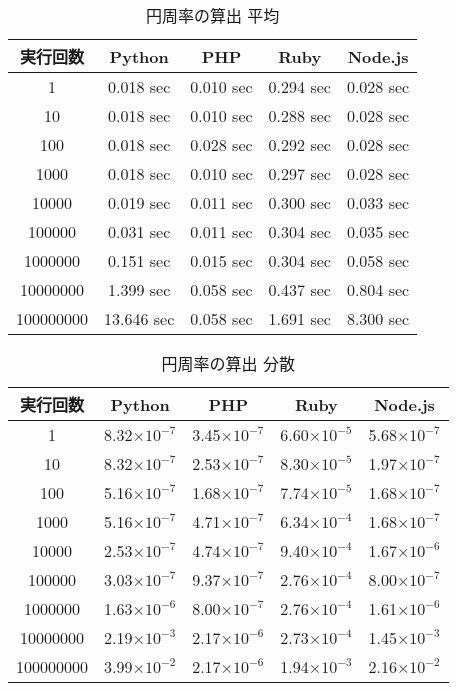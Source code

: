 \begin{table}[tb]
\centering
\begin{tabular}{|c||c|c|c|c|}
\hline
実行回数	&Python	&PHP	&Ruby	&Node.js\\ \hline \hline
1   	    &0.018 sec	&0.010 sec	&0.294 sec	&0.028 sec\\ \hline
10	        &0.018 sec	&0.010 sec	&0.288 sec	&0.028 sec\\ \hline
100	        &0.018 sec	&0.028 sec	&0.292 sec	&0.028 sec\\ \hline
1000	    &0.018 sec	&0.010 sec	&0.297 sec	&0.028 sec\\ \hline
10000	    &0.019 sec	&0.011 sec	&0.300 sec	&0.033 sec\\ \hline
100000  	&0.031 sec	&0.011 sec	&0.304 sec	&0.035 sec\\ \hline
1000000	    &0.151 sec	&0.015 sec	&0.304 sec	&0.058 sec\\ \hline
10000000	&1.399 sec	&0.058 sec	&0.437 sec	&0.804 sec\\ \hline
100000000	&13.646 sec	&0.058 sec	&1.691 sec	&8.300 sec\\ \hline
\end{tabular}
\caption{円周率の算出 平均}
\label{table:p-average}
\end{table}

\begin{table}[tb]
\centering
\begin{tabular}{|c||c|c|c|c|}
\hline
実行回数	&Python	&PHP	&Ruby	&Node.js\\ \hline \hline
1	    	&8.32$\times 10^{-7}$	&3.45$\times 10^{-7}$	&6.60$\times 10^{-5}$	&5.68$\times 10^{-7}$\\ \hline
10	    	&8.32$\times 10^{-7}$	&2.53$\times 10^{-7}$	&8.30$\times 10^{-5}$	&1.97$\times 10^{-7}$\\ \hline
100	    	&5.16$\times 10^{-7}$	&1.68$\times 10^{-7}$	&7.74$\times 10^{-5}$	&1.68$\times 10^{-7}$\\ \hline
1000		&5.16$\times 10^{-7}$	&4.71$\times 10^{-7}$	&6.34$\times 10^{-4}$	&1.68$\times 10^{-7}$\\ \hline
10000		&2.53$\times 10^{-7}$	&4.74$\times 10^{-7}$	&9.40$\times 10^{-4}$	&1.67$\times 10^{-6}$\\ \hline
100000		&3.03$\times 10^{-7}$	&9.37$\times 10^{-7}$	&2.76$\times 10^{-4}$	&8.00$\times 10^{-7}$\\ \hline
1000000		&1.63$\times 10^{-6}$	&8.00$\times 10^{-7}$	&2.76$\times 10^{-4}$	&1.61$\times 10^{-6}$\\ \hline
10000000	&2.19$\times 10^{-3}$	&2.17$\times 10^{-6}$	&2.73$\times 10^{-4}$	&1.45$\times 10^{-3}$\\ \hline
100000000	&3.99$\times 10^{-2}$	&2.17$\times 10^{-6}$	&1.94$\times 10^{-3}$	&2.16$\times 10^{-2}$\\ \hline

\end{tabular}
\caption{円周率の算出 分散}
\label{table:p-dispersion}
\end{table}

